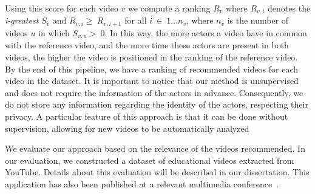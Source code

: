 Using this score for each video $v$ we compute a ranking $R_{v}$ where $R_{v,i}$ denotes the \emph{i-greatest} $S_v$ and $R_{v,i}\ge~R_{v,i+1}$ for all $i~\in~1...n_v$, where $n_v$ is the number of videos $u$ in which $S_{v,u}>~0$. 
In this way, the more actors a video have in common with the reference video, and the more time these actors are present in both videos, the higher the video is positioned in the ranking of the reference video.  
By the end of this pipeline, we have a ranking of recommended videos for each video in the dataset.
It is important to notice that our method is unsupervised and does not require the information of the actors in advance.
Consequently, we do not store any information regarding the identity of the actors, respecting their privacy.
A particular feature of this approach is that it can be done without supervision, allowing for new videos to be automatically analyzed

We evaluate our approach based on the relevance of the videos recommended. 
In our evaluation, we constructed a dataset of educational videos extracted from YouTube.
Details about this evaluation will be described in our dissertation. 
This application has also been published at a relevant multimedia conference~\cite{mendes2020ISM}.